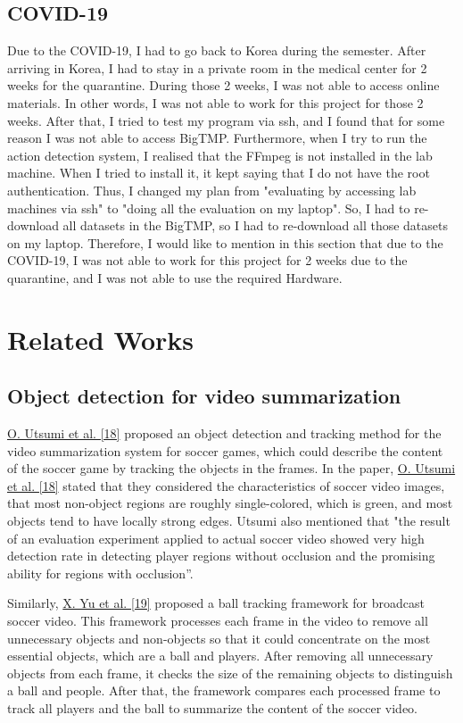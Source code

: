 \documentclass{article}
\begin{document}
\subsection{COVID-19}

Due to the COVID-19, I had to go back to Korea during the semester. After arriving in Korea, I had to stay in a private room in the medical center for 2 weeks for the quarantine. During those 2 weeks, I was not able to access online materials. In other words, I was not able to work for this project for those 2 weeks. After that, I tried to test my program via ssh, and I found that for some reason I was not able to access BigTMP. Furthermore, when I try to run the action detection system, I realised that the FFmpeg is not installed in the lab machine. When I tried to install it, it kept saying that I do not have the root authentication. Thus, I changed my plan from "evaluating by accessing lab machines via ssh" to "doing all the evaluation on my laptop". So, I had to re-download all datasets in the BigTMP, so I had to re-download all those datasets on my laptop. Therefore, I would like to mention in this section that due to the COVID-19, I was not able to work for this project for 2 weeks due to the quarantine, and I was not able to use the required Hardware.


\section{Related Works}

\subsection{Object detection for video summarization}

\hyperlink{ref18}{O. Utsumi et al. [18]} proposed an object detection and tracking method for the video summarization system for soccer games, which could describe the content of the soccer game by tracking the objects in the frames. In the paper, \hyperlink{ref18}{O. Utsumi et al. [18]} stated that they considered the characteristics of soccer video images, that most non-object regions are roughly single-colored, which is green, and most objects tend to have locally strong edges. Utsumi also mentioned that "the result of an evaluation experiment applied to actual soccer video showed very high detection rate in detecting player regions without occlusion and the promising ability for regions with occlusion”.

Similarly, \hyperlink{ref19}{X. Yu et al. [19]} proposed a ball tracking framework for broadcast soccer video. This framework processes each frame in the video to remove all unnecessary objects and non-objects so that it could concentrate on the most essential objects, which are a ball and players. After removing all unnecessary objects from each frame, it checks the size of the remaining objects to distinguish a ball and people. After that, the framework compares each processed frame to track all players and the ball to summarize the content of the soccer video.
\end{document}

